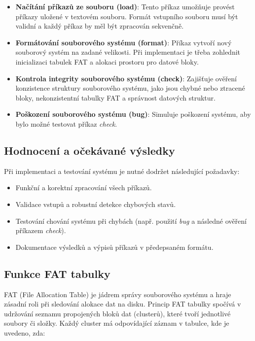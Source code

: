 \documentclass[12pt, a4paper]{article}
\begin{document}
\begin{itemize}
    \item \textbf{Načítání příkazů ze souboru (load)}: Tento příkaz umožňuje provést příkazy uložené v textovém souboru. Formát vstupního souboru musí být validní a každý příkaz by měl být zpracován sekvenčně.
    
    \item \textbf{Formátování souborového systému (format)}: Příkaz vytvoří nový souborový systém na zadané velikosti. Při implementaci je třeba zohlednit inicializaci tabulek FAT a alokaci prostoru pro datové bloky.
    
    \item \textbf{Kontrola integrity souborového systému (check)}: Zajišťuje ověření konzistence struktury souborového systému, jako jsou chybné nebo ztracené bloky, nekonzistentní tabulky FAT a správnost datových struktur.
    
    \item \textbf{Poškození souborového systému (bug)}: Simuluje poškození systému, aby bylo možné testovat příkaz \textit{check}.
\end{itemize}

\subsection{Hodnocení a očekávané výsledky}

Při implementaci a testování systému je nutné dodržet následující požadavky:
\begin{itemize}
    \item Funkční a korektní zpracování všech příkazů.
    \item Validace vstupů a robustní detekce chybových stavů.
    \item Testování chování systému při chybách (např. použití \textit{bug} a následné ověření příkazem \textit{check}).
    \item Dokumentace výsledků a výpisů příkazů v předepsaném formátu.
\end{itemize}

\subsection{Funkce FAT tabulky}

FAT (File Allocation Table) je jádrem správy souborového systému a hraje zásadní roli při sledování alokace dat na disku. Princip FAT tabulky spočívá v udržování seznamu propojených bloků dat (clusterů), které tvoří jednotlivé soubory či složky. Každý cluster má odpovídající záznam v tabulce, kde je uvedeno, zda:
\end{document}
